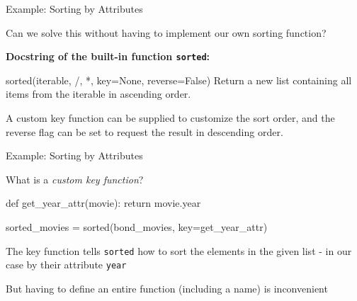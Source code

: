 \begin{frame}[fragile]{Example: Sorting by Attributes}

    \begin{block}{}
        Can we solve this without having to implement our own sorting function?
    \end{block}

    \begin{exampleblock}{{\bf Docstring of the built-in function {\tt sorted}:}}
        \begin{outputcode}
sorted(iterable, /, *, key=None, reverse=False)
    Return a new list containing all items from the
    iterable in ascending order.

    A custom key function can be supplied to customize
    the sort order, and the reverse flag can be set to
    request the result in descending order.
        \end{outputcode}
    \end{exampleblock}

\end{frame}

\begin{frame}[fragile]{Example: Sorting by Attributes}

    What is a {\it custom key function}?

    \vspace{0.5em}

    \begin{pythoncode}
def get_year_attr(movie):
    return movie.year

sorted_movies = sorted(bond_movies, key=get_year_attr)
    \end{pythoncode}

    \begin{alertblock}{}
        The key function tells {\tt sorted} how to sort the elements in the given list - in our case by their attribute {\tt year}
    \end{alertblock}

    But having to define an entire function (including a name) is inconvenient


\end{frame}

